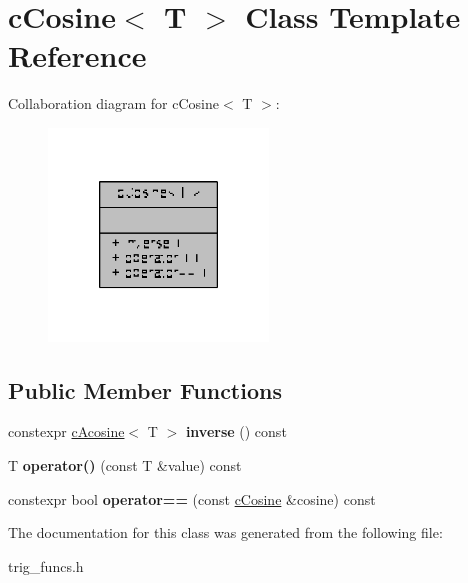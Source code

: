 \hypertarget{classcCosine}{\section{c\-Cosine$<$ T $>$ Class Template Reference}
\label{classcCosine}
}


Collaboration diagram for c\-Cosine$<$ T $>$\-:
\nopagebreak
\begin{figure}[H]
\begin{center}
\leavevmode
\includegraphics[width=166pt]{classcCosine__coll__graph}
\end{center}
\end{figure}
\subsection*{Public Member Functions}
\begin{DoxyCompactItemize}
\item 
\hypertarget{classcCosine_a346d1b8ef570e40efe3c0633e0140ed6}{constexpr \hyperlink{classcAcosine}{c\-Acosine}$<$ T $>$ {\bfseries inverse} () const }\label{classcCosine_a346d1b8ef570e40efe3c0633e0140ed6}

\item 
\hypertarget{classcCosine_a43ecebafce8c9407ef3abf677e2b4377}{T {\bfseries operator()} (const T \&value) const }\label{classcCosine_a43ecebafce8c9407ef3abf677e2b4377}

\item 
\hypertarget{classcCosine_a8e848b4a1e7a2da3bf8dc407fe0e7d6b}{constexpr bool {\bfseries operator==} (const \hyperlink{classcCosine}{c\-Cosine} \&cosine) const }\label{classcCosine_a8e848b4a1e7a2da3bf8dc407fe0e7d6b}

\end{DoxyCompactItemize}


The documentation for this class was generated from the following file\-:\begin{DoxyCompactItemize}
\item 
trig\-\_\-funcs.\-h\end{DoxyCompactItemize}
